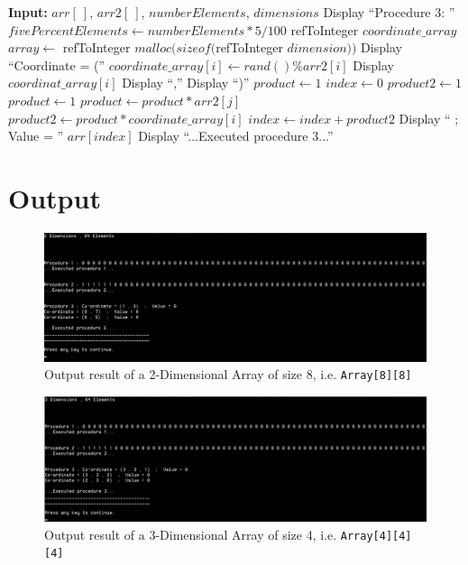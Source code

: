 \documentclass[10pt, conference]{IEEEtran}
\begin{document}
\begin{appendices}
\begin{algorithm}[h!]
\begin{algorithmic}
\STATE \textbf{Input:} $arr[\ ]$, $arr2[\ ]$, $numberElements$, $dimensions$
\STATE
\STATE Display ``Procedure 3: ''
\STATE $fivePercentElements \leftarrow numberElements*5/100$
	\STATE refToInteger $coordinate\_array$
	\STATE $array \leftarrow$ refToInteger $malloc(sizeof($refToInteger $dimension))$	
	\STATE Display ``Coordinate = (''
		\STATE $coordinate\_array[i] \leftarrow rand()\%arr2[i]$
		\STATE Display $coordinat\_array[i]$
			\STATE Display ``,''
		\ENDIF
	\ENDFOR
	\STATE Display ``)''
	\STATE $product \leftarrow 1$
	\STATE $index \leftarrow 0$
	\STATE $product2 \leftarrow 1$
		\STATE $product \leftarrow 1$
			\STATE $product \leftarrow product * arr2[j]$
		\ENDFOR
		\STATE $product2 \leftarrow product*coordinate\_array[i]$
		\STATE $index \leftarrow index + product2$
	\ENDFOR
	\STATE Display `` ; Value = '' $arr[index]$
\ENDFOR
\STATE Display ``...Executed procedure 3...''

\end{algorithmic}
\end{algorithm}

\onecolumn
\center
\section{Output}
\label{Output}

\begin{figure}[h!]
\renewcommand{\thefigure}{\arabic{figure}}
\centering
\includegraphics[scale=0.6]{Result2D.jpg}
\caption{Output result of a 2-Dimensional Array of size 8, i.e. \texttt{Array[8][8]} }
\label{Result2D}
\end{figure}

\begin{figure}[h!]
\renewcommand{\thefigure}{\arabic{figure}}
\centering
\includegraphics[scale=0.6]{Result3D.jpg}
\caption{Output result of a 3-Dimensional Array of size 4, i.e. \texttt{Array[4][4][4]} }
\label{Result3D}
\end{figure}


\end{appendices}
\end{document}
